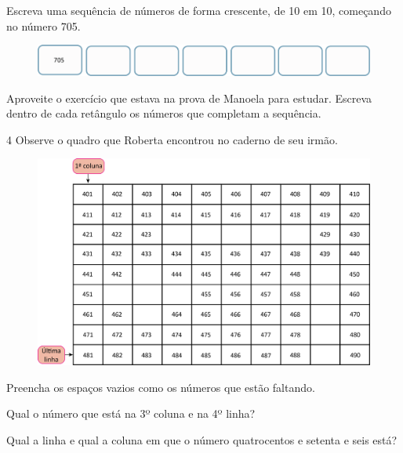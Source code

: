 Escreva uma sequência de números de forma crescente, de 10 em 10, começando no número 705.

\begin{figure}[htpb!]
\includegraphics[width=\textwidth]{./media/image29.png}
\end{figure}

Aproveite o exercício que estava na prova de Manoela para estudar.
Escreva dentro de cada retângulo os números que completam a sequência.


\num{4} Observe o quadro que Roberta encontrou no caderno de seu irmão.

\begin{figure}[htpb!]
\includegraphics[width=\textwidth]{./media/image30.png}
\end{figure}

\begin{escolha}
\item Preencha os espaços vazios como os números que estão faltando.


\item Qual o número que está na 3º coluna e na 4º linha?


\item Qual a linha e qual a coluna em que o número quatrocentos e setenta e seis está?

\end{escolha}

